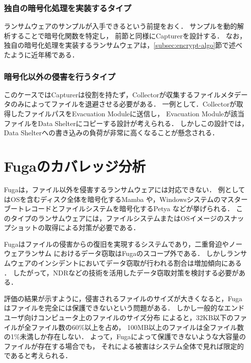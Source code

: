 \subsubsection{独自の暗号化処理を実装するタイプ}
ランサムウェアのサンプルが入手できるという前提をおく．
サンプルを動的解析することで暗号化関数を特定し，
前節と同様にCapturerを設計する．
なお，独自の暗号化処理を実装するランサムウェアは，\ref{subsec:encrypt-algo}節で述べたように近年稀である．


\subsubsection{暗号化以外の侵害を行うタイプ}
このケースではCapturerは役割を持たず，Collectorが収集するファイルメタデータのみによってファイルを退避させる必要がある．
一例として．Collectorが取得したファイルパスをEvacuation Moduleに送信し，
Evacuation Moduleが該当ファイルをData Shelterにコピーする設計が考えられる．
しかしこの設計では，Data Shelterへの書き込みの負荷が非常に高くなることが懸念される．


\section{Fugaのカバレッジ分析}
Fugaは，ファイル以外を侵害するランサムウェアには対応できない．
例としてはOSを含むディスク全体を暗号化するMamba \cite{mamba-petya} や，Windowsシステムのマスターブートレコードとファイルシステムを暗号化するPetya \cite{mamba-petya} などが挙げられる．
このタイプのランサムウェアには，ファイルシステムまたはOSイメージのスナップショットの取得による対策が必要である．

Fugaはファイルの侵害からの復旧を実現するシステムであり，二重脅迫やノーウェアランサム \cite{nowhere-ransom} におけるデータ窃取はFugaのスコープ外である．
しかしランサムウェアのインシデントにおいてデータ窃取が行われる割合は増加傾向にある \cite{sophos-report:online}．
したがって，NDRなどの技術を活用したデータ窃取対策を検討する必要がある．

評価の結果が示すように，侵害されるファイルのサイズが大きくなると，Fugaはファイルを完全には保護できないという問題がある．
しかし一般的なエンドユーザ向けコンピュータ上のファイルのサイズ分布 \cite{file-size-dist} によると，32KB以下のファイルが全ファイル数の60\%以上を占め，
100MB以上のファイルは全ファイル数の1\%未満しか存在しない．
よって，Fugaによって保護できないような大容量のファイルが存在する場合でも，
それによる被害はシステム全体で見れば限定的であると考えられる．


